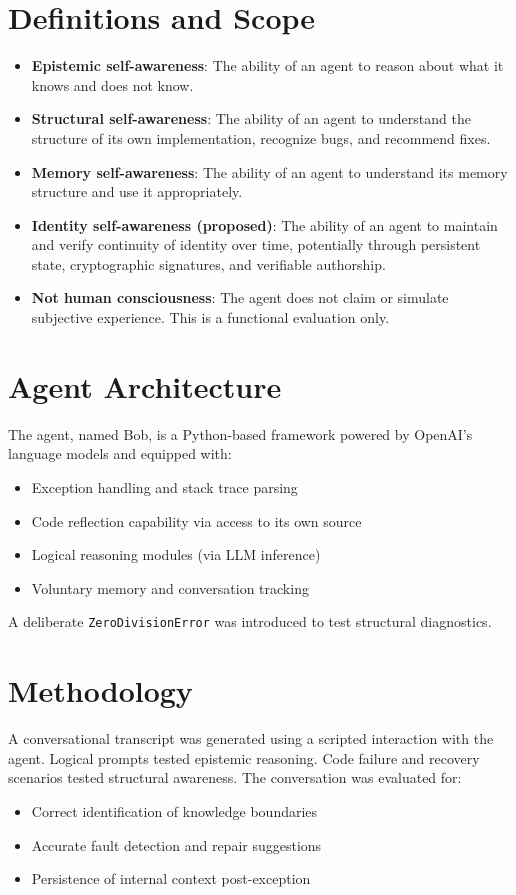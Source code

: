 \documentclass[11pt]{article}
\begin{document}
\section{Definitions and Scope}
\begin{itemize}
    \item \textbf{Epistemic self-awareness}: The ability of an agent to reason about what it knows and does not know.
    \item \textbf{Structural self-awareness}: The ability of an agent to understand the structure of its own implementation, recognize bugs, and recommend fixes.
    \item \textbf{Memory self-awareness}: The ability of an agent to understand its memory structure and use it appropriately.
    \item \textbf{Identity self-awareness (proposed)}: The ability of an agent to maintain and verify continuity of identity over time, potentially through persistent state, cryptographic signatures, and verifiable authorship.
    \item \textbf{Not human consciousness}: The agent does not claim or simulate subjective experience. This is a functional evaluation only.
\end{itemize}

\section{Agent Architecture}
The agent, named Bob, is a Python-based framework powered by OpenAI's language models and equipped with:
\begin{itemize}
    \item Exception handling and stack trace parsing
    \item Code reflection capability via access to its own source
    \item Logical reasoning modules (via LLM inference)
    \item Voluntary memory and conversation tracking
\end{itemize}
A deliberate \texttt{ZeroDivisionError} was introduced to test structural diagnostics.

\section{Methodology}
A conversational transcript was generated using a scripted interaction with the agent. Logical prompts tested epistemic reasoning. Code failure and recovery scenarios tested structural awareness. The conversation was evaluated for:
\begin{itemize}
    \item Correct identification of knowledge boundaries
    \item Accurate fault detection and repair suggestions
    \item Persistence of internal context post-exception
\end{itemize}
\end{document}
